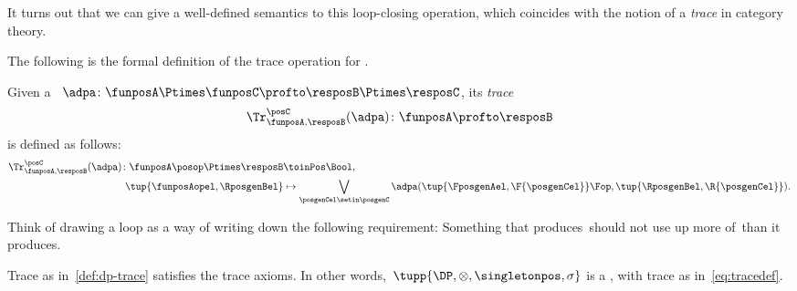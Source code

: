 It turns out that we can give a well-defined semantics to this loop-closing operation, which coincides with the notion of a \emph{trace} in category theory.

The following is the formal definition of the trace operation for .

\begin{ctdefinition}
    \label{def:dp-trace}
    Given a ~$\adpa\colon \funposA \Ptimes \funposC \profto \resposB \Ptimes \resposC$, its \emph{trace}
    \begin{equation}
        \Tr_{\funposA,\resposB}^\posC(\adpa) \colon \funposA \profto \resposB
    \end{equation}
    is defined as follows:
    \begin{equation}
        \label{eq:tracedef}
        \begin{aligned}
            \Tr_{\funposA,\resposB}^\posC(\adpa) \colon \funposA\posop \Ptimes \resposB & \toinPos \Bool, \\
            \tup{\funposAopel, \RposgenBel}                                             & \mapsto \bigvee_{\posgenCel \setin \posgenC}
            \adpa(\tup{\FposgenAel, \F{\posgenCel}}\Fop,
            \tup{\RposgenBel, \R{\posgenCel}}).
        \end{aligned}
    \end{equation}
\end{ctdefinition}

Think of drawing a loop as a way of writing down the following requirement:
Something that produces~\posC should not use up more of~\posC than it produces.

\begin{lemma}\label{lem:dp-trace-is-trace}
    Trace as in~\cref{def:dp-trace} satisfies the trace axioms.
    In other words,~$\tupp{\DP, {{\otimes}}, \singletonpos, \sigma}$ is a , with trace as in~\cref{eq:tracedef}.
\end{lemma}


